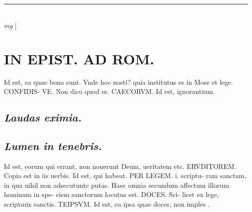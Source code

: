 \documentclass{article}
\begin{document}
\begin{pages}
\section*{}
\marginpar{[ p.]}
{}
\subsection*{\textit{}}
{}
\subsection*{\textit{}}\pstart  \pend\pstart  \pend\pstart  \pend
{}
{}
\subsection*{\textit{}}
\vspace{0.5cm}\noindent
\vspace{0.2cm}\rule{1cm}{0.2pt}\\ 
\hspace{0.2cm}\textit{mg}
\footnotesize 
\normalsize| 
\section*{IN EPIST. AD ROM.  }
\marginpar{[ p.21 ]}\pstart Id est, ea quae bona sunt. Vnde hoc nosti? quia institutus es in Mose et lege. CONFIDIS- VE. Non dico quod es. CAECORVM.  Id est, ignorantium.   \pend
{}
{}
\subsection*{\textit{Laudas eximia. }}
{}
\subsection*{\textit{Lumen in tenebris. }}\pstart Id est, eorum qui errant, non nouerunt Deum, ueritatem etc. ERVDITOREM. Copia est in iis uerbis.  \pend\pstart Id est, qui habeat. PER LEGEM. i. scriptu- ram sanctam, in qua nihil non adsecutunte putas. Haec omnia secundum affectum illorum hominum in spe- ciem sanctorum locutus est. DOCES. Sci- licet ex lege, scripturis sanctis. TEIPSVM.  Id est, ea ipsa quae doces, non imples .   \pend
{}
{}

\end{pages}
\end{document}
